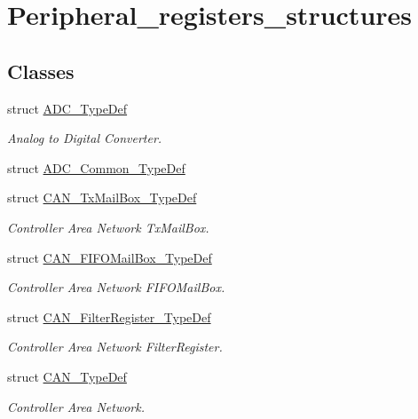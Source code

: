 \hypertarget{group___peripheral__registers__structures}{}\section{Peripheral\+\_\+registers\+\_\+structures}
\label{group___peripheral__registers__structures}
\subsection*{Classes}
\begin{DoxyCompactItemize}
\item 
struct \mbox{\hyperlink{struct_a_d_c___type_def}{A\+D\+C\+\_\+\+Type\+Def}}
\begin{DoxyCompactList}\small\item\em Analog to Digital Converter. \end{DoxyCompactList}\item 
struct \mbox{\hyperlink{struct_a_d_c___common___type_def}{A\+D\+C\+\_\+\+Common\+\_\+\+Type\+Def}}
\item 
struct \mbox{\hyperlink{struct_c_a_n___tx_mail_box___type_def}{C\+A\+N\+\_\+\+Tx\+Mail\+Box\+\_\+\+Type\+Def}}
\begin{DoxyCompactList}\small\item\em Controller Area Network Tx\+Mail\+Box. \end{DoxyCompactList}\item 
struct \mbox{\hyperlink{struct_c_a_n___f_i_f_o_mail_box___type_def}{C\+A\+N\+\_\+\+F\+I\+F\+O\+Mail\+Box\+\_\+\+Type\+Def}}
\begin{DoxyCompactList}\small\item\em Controller Area Network F\+I\+F\+O\+Mail\+Box. \end{DoxyCompactList}\item 
struct \mbox{\hyperlink{struct_c_a_n___filter_register___type_def}{C\+A\+N\+\_\+\+Filter\+Register\+\_\+\+Type\+Def}}
\begin{DoxyCompactList}\small\item\em Controller Area Network Filter\+Register. \end{DoxyCompactList}\item 
struct \mbox{\hyperlink{struct_c_a_n___type_def}{C\+A\+N\+\_\+\+Type\+Def}}
\begin{DoxyCompactList}\small\item\em Controller Area Network. \end{DoxyCompactList}\item 

\end{DoxyCompactItemize}
